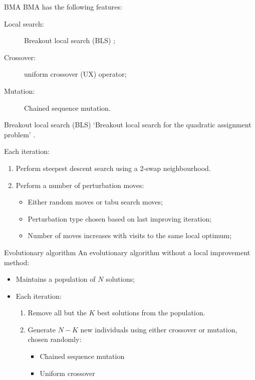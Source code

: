 {{        \begin{frame}{BMA \citep{Benlic:2015gp}}
            BMA has the following features:
            \begin{description}
                \item[Local search:] Breakout local search (BLS) \citep{Benlic:2013gi};
                \item[Crossover:]  uniform crossover (UX) operator;
                \item[Mutation:] Chained sequence mutation.
            \end{description}
        \end{frame}

        \begin{frame}{Breakout local search (BLS)}
            `Breakout local search for the quadratic assignment problem' \citep{Benlic:2013gi}.

            Each iteration:
            \begin{enumerate}
                \item Perform steepest descent search using a 2-swap neighbourhood.
                \item Perform a number of perturbation moves:
                    \begin{itemize}
                        \item Either random moves or tabu search moves;
                        \item Perturbation type chosen based on last improving iteration;
                        \item Number of moves increases with visits to the same local optimum;
                    \end{itemize}
            \end{enumerate}
        \end{frame}

        \begin{frame}{Evolutionary algorithm}
            An evolutionary algorithm without a local improvement method:
            \begin{itemize}
                \item Maintains a population of \(N\) solutions;
                \item Each iteration:
                \begin{enumerate}
                    \item Remove all but the \(K\) best solutions from the population.
                    \item Generate \(N-K\) new individuals using either crossover or mutation, chosen randomly:
                        \begin{itemize}
                            \item Chained sequence mutation
                            \item Uniform crossover
                        \end{itemize}
                \end{enumerate}
            \end{itemize}
        \end{frame}
    }

}
